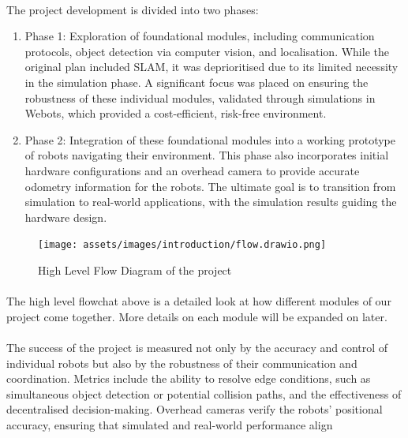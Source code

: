 \paragraph*{}
The project development is divided into two phases:

\begin{enumerate}
    \item Phase 1: Exploration of foundational modules, including communication protocols, object detection via computer vision, and localisation. While the original plan included SLAM, it was deprioritised due to its limited necessity in the simulation phase.  A significant focus was placed on ensuring the robustness of these individual modules, validated through simulations in Webots, which provided a cost-efficient, risk-free environment.
    \item Phase 2: Integration of these foundational modules into a working prototype of robots navigating their environment. This phase also incorporates initial hardware configurations and an overhead camera to provide accurate odometry information for the robots. The ultimate goal is to transition from simulation to real-world applications, with the simulation results guiding the hardware design.
\end{enumerate}

\begin{figure} [H]
    \centering
    \texttt{[image: assets/images/introduction/flow.drawio.png]}
    \caption{High Level Flow Diagram of the project}
    \label{fig:high-level-flow}
\end{figure}


\paragraph*{}
The high level flowchat above is a detailed look at how different modules of our project come together. More details on each module will be expanded on later.
\paragraph*{}
The success of the project is measured not only by the accuracy and control of individual robots but also by the robustness of their communication and coordination. Metrics include the ability to resolve edge conditions, such as simultaneous object detection or potential collision paths, and the effectiveness of decentralised decision-making. Overhead cameras verify the robots’ positional accuracy, ensuring that simulated and real-world performance align

